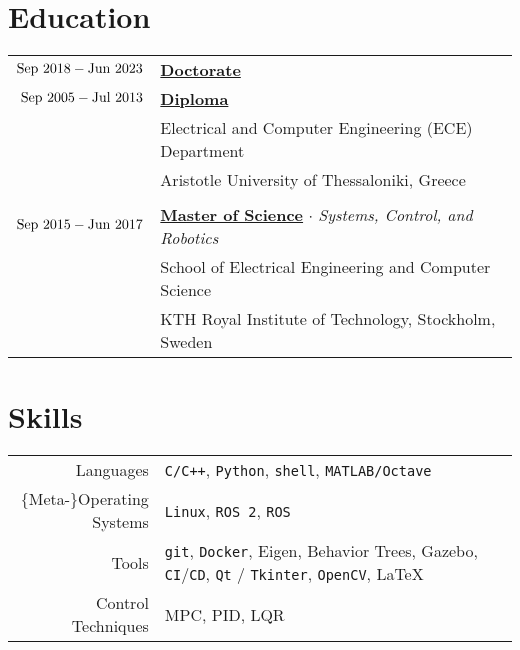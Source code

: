 \documentclass[a4paper,10pt,twoside]{article}
\begin{document}
\section{Education}

\begin{tabular}{rp{12cm}}
$\textnormal{Sep } 2018 - \textnormal{Jun } 2023$ & \href{https://ikee.lib.auth.gr/record/354644}{\textbf{Doctorate}} \\
$\textnormal{Sep } 2005 - \textnormal{Jul } 2013$ & \href{https://ikee.lib.auth.gr/record/291560}{\textbf{Diploma}} \\
                                                 & Electrical and Computer Engineering (ECE) Department\\
                                                 & Aristotle University of Thessaloniki, Greece \\\vspace{-7pt}
&\\
$\textnormal{Sep }2015 - \textnormal{Jun }2017$ & \href{http://kth.diva-portal.org/smash/record.jsf?pid=diva2\%3A1102597\&dswid=2875}{\textbf{Master of Science}} $\cdot$ \textit{Systems, Control, and Robotics}\\
                                                & School of Electrical Engineering and Computer Science\\
                                                & KTH Royal Institute of Technology, Stockholm, Sweden\\
\end{tabular}\vspace{7pt}

\section{Skills}

\begin{tabular}{rp{12cm}}
Languages & \texttt{C/C++}, \texttt{Python}, \texttt{shell}, \texttt{MATLAB/Octave} \\
$\{$Meta-$\}$Operating Systems & \texttt{Linux}, \texttt{ROS 2}, \texttt{ROS} \\
  Tools & \texttt{git}, \texttt{Docker}, Eigen, Behavior Trees, Gazebo, \texttt{CI}/\texttt{CD}, \texttt{Qt} / \texttt{Tkinter}, \texttt{OpenCV}, \LaTeX \\
Control Techniques & MPC, PID, LQR \\
\end{tabular}
\end{document}
